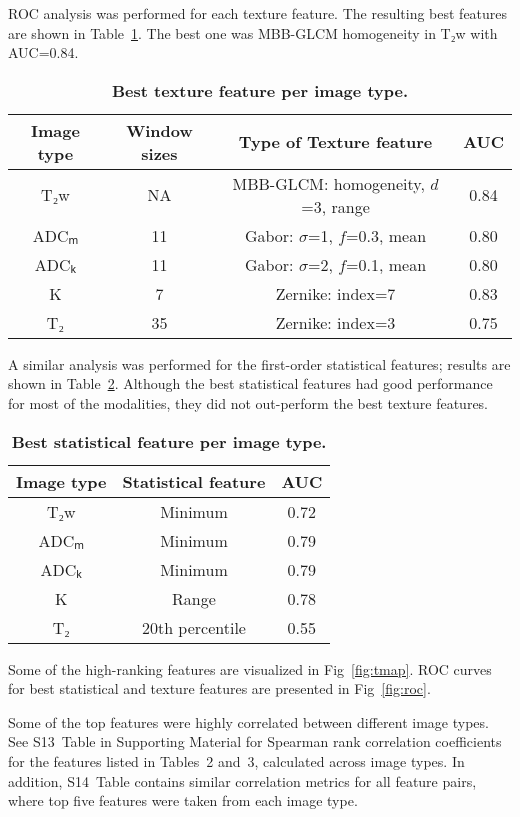 \documentclass[10pt,letterpaper]{article}
\begin{document}
ROC analysis was performed for each texture feature. The resulting best features
are shown in Table~\ref{tab:texture_imagetype}. The best one was MBB-GLCM
homogeneity in T₂w with AUC=0.84.

\begin{table}[!h]
\centering
\caption{{\bf Best texture feature per image type.}}%
\label{tab:texture_imagetype}

\begin{tabular}{c c c c}
\hline
Image type & Window sizes & Type of Texture feature & AUC \\
\hline
T₂w & NA & MBB-GLCM\@: homogeneity, $d$=3, range & 0.84 \\
ADCₘ & 11 & Gabor: $\sigma$=1, $f$=0.3, mean & 0.80 \\
ADCₖ & 11 & Gabor: $\sigma$=2, $f$=0.1, mean & 0.80 \\
K & 7 & Zernike: index=7 & 0.83 \\
T₂ & 35 & Zernike: index=3 & 0.75 \\
\hline
\end{tabular}
\end{table}

A similar analysis was performed for the first-order statistical features;
results are shown in Table~\ref{tab:stats_imagetype}. Although the best
statistical features had good performance for most of the modalities, they did
not out-perform the best texture features.

\begin{table}[!h]
\centering
\caption{{\bf Best statistical feature per image type.}}%
\label{tab:stats_imagetype}

\begin{tabular}{c c c}
\hline
Image type & Statistical feature & AUC \\
\hline
T₂w & Minimum & 0.72 \\
ADCₘ & Minimum & 0.79 \\
ADCₖ & Minimum & 0.79 \\
K & Range & 0.78 \\
T₂ & 20th percentile & 0.55 \\
\hline
\end{tabular}
\end{table}

Some of the high-ranking features are visualized in Fig~\ref{fig:tmap}. ROC
curves for best statistical and texture features are presented in
Fig~\ref{fig:roc}.

Some of the top features were highly correlated between different image types.
See S13~Table in Supporting Material for Spearman rank correlation coefficients
for the features listed in Tables~2 and~3, calculated across image types. In
addition, S14~Table contains similar correlation metrics for all feature pairs,
where top five features were taken from each image type.
\end{document}
